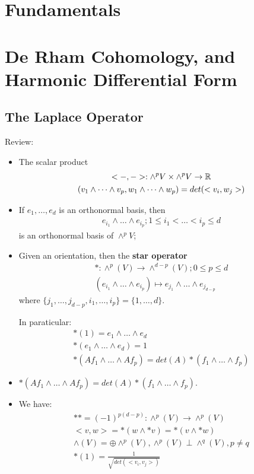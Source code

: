 \documentclass[Total.tex]{subfiles}
\begin{document}
	\chapter{Fundamentals}
	\chapter{De Rham Cohomology, and Harmonic Differential Form}
		\section{The Laplace Operator}
			Review:
			\begin{itemize}
				\item The scalar product
				\begin{gather*}
					<-,->:\wedge^p V\times \wedge^p V\rightarrow \mathbb{R}\\
					(v_1\wedge\dots\wedge v_p,w_1\wedge \dots\wedge w_p)=det(<v_i,w_j>)
				\end{gather*}
				\item If $e_1,\dots,e_d$ is an orthonormal basis, then 
				\begin{gather*}
					e_{i_1}\wedge \dots\wedge e_{i_p};1\leq i_1<\dots<i_p\leq d
				\end{gather*}
				is an orthonormal basis of $\wedge^p V$;
				\item Given an orientation, then the \textbf{star operator}
				\begin{gather*}
					*:\wedge^p(V)\rightarrow\wedge^{d-p}(V);0\leq p\leq d\\
					(e_{i_1}\wedge\dots\wedge e_{i_p})\mapsto e_{j_1}\wedge\dots\wedge e_{j_{d-p}}
				\end{gather*}
				where $\{j_1,\dots,j_{d-p},i_1,\dots,i_p\}=\{1,\dots,d\}$.
				
				In paraticular:
				\begin{gather*}
					*(1)=e_1\wedge\dots\wedge e_d\\
					*(e_1\wedge\dots\wedge e_d)=1\\
					*(Af_1\wedge\dots\wedge Af_p)=det(A)*(f_1\wedge\dots\wedge f_p)
				\end{gather*}
				\item $*(Af_1\wedge \dots\wedge Af_p)=det(A)*(f_1\wedge \dots\wedge f_p)$.
				\item We have:
				\begin{gather*}
					**=(-1)^{p(d-p)}:\wedge^p(V)\rightarrow \wedge^p(V)\\
					<v,w>=*(w\wedge *v)=*(v\wedge *w)\\
					\wedge(V)=\oplus \wedge^p(V),\wedge^p(V)\perp \wedge^q(V),p\not=q\\
					*(1)=\frac{1}{\sqrt{det(<v_i,v_j>)}}
				\end{gather*}
			\end{itemize}
\end{document}
